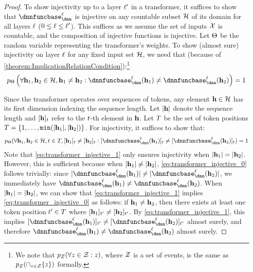\begin{proof}
    To show injectivity up to a layer $\ell'$ in a transformer, it suffices to show that $\dnnfunclayer{\layer}$ is injective on any countable subset $\mathcal{H}$ of its domain for all layers $\ell$ ($0\leq\ell\leq\ell'$). 
    This suffices as we assume the set of inputs $\mathcal{X}$ is countable, and the composition of injective functions is injective. 
    Let $\Theta$ be the random variable representing the transformer's weights. 
    To show (almost sure) injectivity on layer $\ell$ for any fixed input set $\mathcal{H}$, we need that (because of \cref{theorem:ImplicationRelationCondition}):\footnote{We note that $p_{Z}(\forall z \in \mathcal{Z}: z)$, where $\mathcal{Z}$ is a set of events, is the same as $p_{Z}(\cap_{z \in \mathcal{Z}} \{z\})$ formally.}
    \begin{align}
        \prob_{\Parameters}\left(\forall \hiddenstates_1,\hiddenstates_2\in \InputSet, \hiddenstates_1 \neq \hiddenstates_2: \dnnfunclayer{\layer}(\hiddenstates_1)\neq\dnnfunclayer{\layer}(\hiddenstates_2)  \right)=1\label{eq:transformer_injective_0}
    \end{align}

    Since the transformer operates over sequences of tokens, any element $\mathbf{h}\in\mathcal{H}$ has its first dimension indexing the sequence length. Let $\lvert\mathbf{h}\rvert$ denote the sequence length and $[\mathbf{h}]_{t}$ refer to the $t$-th element in $\mathbf{h}$. Let $T$ be the set of token positions $T = \{1, \ldots, \mathtt{min}(\lvert\mathbf{h}_1\rvert, \lvert\mathbf{h}_2\rvert)\}$. For injectivity, it suffices to show that:
    \begin{align}
        \prob_{\Parameters}(\forall \hiddenstates_1,\hiddenstates_2\in \InputSet, t \in \tokenposRange, \tokenidx{\hiddenstates_1}{\tokenposition}\neq \tokenidx{\hiddenstates_2}{\tokenposition} :  \tokenidx{\dnnfunclayer{\layer}(\hiddenstates_1)}{\tokenposition} \neq \tokenidx{\dnnfunclayer{\layer}(\hiddenstates_2)}{\tokenposition})=1\label{eq:transformer_injective_1}
    \end{align}
    Note that \cref{eq:transformer_injective_1} only ensures injectivity when $|\mathbf{h}_1|=|\mathbf{h}_2|$. However, this is sufficient because when $|\mathbf{h}_1|\neq|\mathbf{h}_2|$, \cref{eq:transformer_injective_0} follows trivially: since $|\dnnfunclayer{\layer}(\hiddenstates_1)|\neq|\dnnfunclayer{\layer}(\hiddenstates_2)|$, we immediately have $\dnnfunclayer{\layer}(\hiddenstates_1)\neq\dnnfunclayer{\layer}(\hiddenstates_2)$. 
    When $|\mathbf{h}_1|=|\mathbf{h}_2|$, we can show that \cref{eq:transformer_injective_1} implies \cref{eq:transformer_injective_0} as follows: if $\mathbf{h}_1\neq\mathbf{h}_2$, then there exists at least one token position $t'\in T$ where $[\mathbf{h}_1]_{t'}\neq[\mathbf{h}_2]_{t'}$. By \cref{eq:transformer_injective_1}, this implies $[\dnnfunclayer{\layer}(\hiddenstates_1)]_{\tokenposition'}\neq[\dnnfunclayer{\layer}(\hiddenstates_2)]_{\tokenposition'}$ almost surely, and therefore $\dnnfunclayer{\layer}(\hiddenstates_1)\neq\dnnfunclayer{\layer}(\hiddenstates_2)$ almost surely.


\end{proof}
